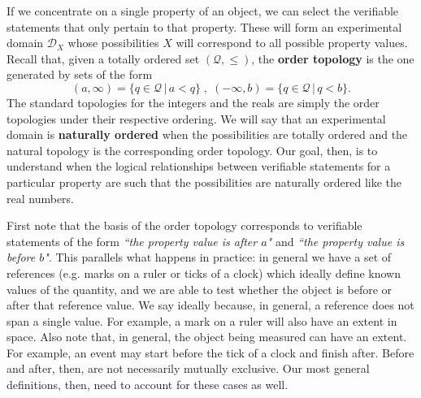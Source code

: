 \documentclass{article}
\newcommand{\edomain}[1][D] {\mathcal{#1}} %
\newcommand{\statement}[1] {\emph{``#1"}}
\begin{document}
If we concentrate on a single property of an object, we can select the verifiable statements that only pertain to that property. These will form an experimental domain $\edomain_X$ whose possibilities $X$ will correspond to all possible property values. Recall that, given a totally ordered set $(\mathcal{Q}, \leq)$, the \textbf{order topology} is the one generated by sets of the form $$(a, \infty) = \{q \in \mathcal{Q} \, | \, a < q\} \;,\; (-\infty, b) = \{q \in \mathcal{Q} \, | \, q < b\}.$$
The standard topologies for the integers and the reals are simply the order topologies under their respective ordering. We will say that an experimental domain is \textbf{naturally ordered} when the possibilities are totally ordered and the natural topology is the corresponding order topology. Our goal, then, is to understand when the logical relationships between verifiable statements for a particular property are such that the possibilities are naturally ordered like the real numbers.

First note that the basis of the order topology corresponds to verifiable statements of the form \statement{the property value is after $a$} and \statement{the property value is before $b$}. This parallels what happens in practice: in general we have a set of references (e.g. marks on a ruler or ticks of a clock) which ideally define known values of the quantity, and we are able to test whether the object is before or after that reference value. We say ideally because, in general, a reference does not span a single value. For example, a mark on a ruler will also have an extent in space. Also note that, in general, the object being measured can have an extent. For example, an event may start before the tick of a clock and finish after. Before and after, then, are not necessarily mutually exclusive. Our most general definitions, then, need to account for these cases as well.
\end{document}
